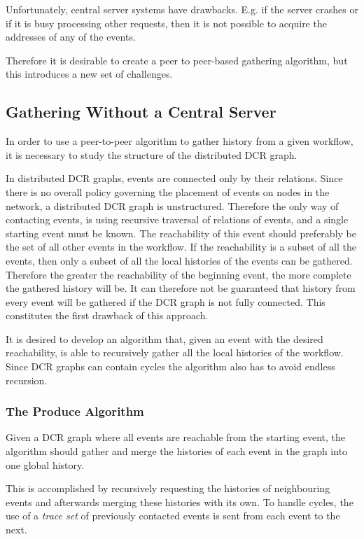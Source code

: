     \newpar Unfortunately, central server systems have drawbacks. E.g. if the server crashes or if it is busy processing other requests, then it is not possible to acquire the addresses of any of the events.
    
    Therefore it is desirable to create a peer to peer-based gathering algorithm, but this introduces a new set of challenges.
    
    \subsection{Gathering Without a Central Server}
    In order to use a peer-to-peer algorithm to gather history from a given workflow, it is necessary to study the structure of the distributed DCR graph.
    
    \newpar In distributed DCR graphs, events are connected only by their relations. Since there is no overall policy governing the placement of events on nodes in the network, a distributed DCR graph is unstructured. Therefore the only way of contacting events, is using recursive traversal of relations of events, and a single starting event must be known. The reachability of this event should preferably be the set of all other events in the workflow. If the reachability is a subset of all the events, then only a subset of all the local histories of the events can be gathered. Therefore the greater the reachability of the beginning event, the more complete the gathered history will be. It can therefore not be guaranteed that history from every event will be gathered if the DCR graph is not fully connected. This constitutes the first drawback of this approach.
	
	It is desired to develop an algorithm that, given an event with the desired reachability, is able to recursively gather all the local histories of the workflow. Since DCR graphs can contain cycles the algorithm also has to avoid endless recursion.
		
	\subsubsection{The Produce Algorithm}
	Given a DCR graph where all events are reachable from the starting event, the algorithm should gather and merge the histories of each event in the graph into one global history.
	
	This is accomplished by recursively requesting the histories of neighbouring events and afterwards merging these histories with its own. To handle cycles, the use of a \textit{trace set} of previously contacted events is sent from each event to the next.
	
